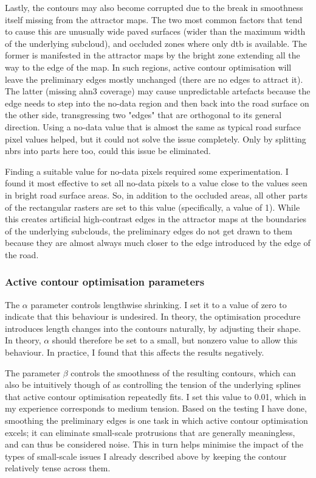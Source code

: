 Lastly, the contours may also become corrupted due to the break in smoothness itself missing from the attractor maps. The two most common factors that tend to cause this are unusually wide paved surfaces (wider than the maximum width of the underlying subcloud), and occluded zones where only \ac{dtb} is available. The former is manifested in the attractor maps by the bright zone extending all the way to the edge of the map. In such regions, active contour optimisation will leave the preliminary edges mostly unchanged (there are no edges to attract it). The latter (missing \ac{ahn3} coverage) may cause unpredictable artefacts because the edge needs to step into the no-data region and then back into the road surface on the other side, transgressing two "edges" that are orthogonal to its general direction. Using a no-data value that is almost the same as typical road surface pixel values helped, but it could not solve the issue completely. Only by splitting \ac{nbrs} into parts here too, could this issue be eliminated.

Finding a suitable value for no-data pixels required some experimentation. I found it most effective to set all no-data pixels to a value close to the values seen in bright road surface areas. So, in addition to the occluded areas, all other parts of the rectangular rasters are set to this value (specifically, a value of 1). While this creates artificial high-contrast edges in the attractor maps at the boundaries of the underlying subclouds, the preliminary edges do not get drawn to them because they are almost always much closer to the edge introduced by the edge of the road.

\subsubsection{Active contour optimisation parameters}

The $\alpha$ parameter controls lengthwise shrinking. I set it to a value of zero to indicate that this behaviour is undesired. In theory, the optimisation procedure introduces length changes into the contours naturally, by adjusting their shape. In theory, $\alpha$ should therefore be set to a small, but nonzero value to allow this behaviour. In practice, I found that this affects the results negatively.

The parameter $\beta$ controls the smoothness of the resulting contours, which can also be intuitively though of as controlling the tension of the underlying splines that active contour optimisation repeatedly fits. I set this value to 0.01, which in my experience corresponds to medium tension. Based on the testing I have done, smoothing the preliminary edges is one task in which active contour optimisation excels; it can eliminate small-scale protrusions that are generally meaningless, and can thus be considered noise. This in turn helps minimise the impact of the types of small-scale issues I already described above by keeping the contour relatively tense across them. 

